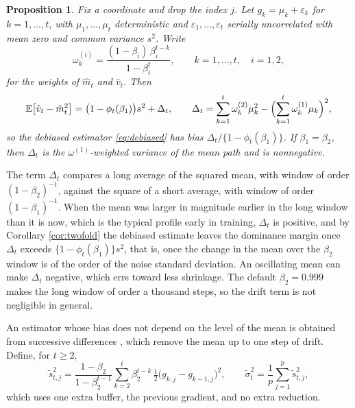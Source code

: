 \documentclass[pdflatex,sn-mathphys-num]{sn-jnl}%
\theoremstyle{thmstyleone}%
\newtheorem{proposition}[theorem]{Proposition}%
\theoremstyle{thmstyletwo}%
\theoremstyle{thmstylethree}%
\newcommand{\E}{\mathbb{E}}
\begin{document}
\begin{proposition}
\label{prop:drift}
Fix a coordinate and drop the index $j$. Let $g_k=\mu_k+\varepsilon_k$ for $k=1,\dots,t$, with $\mu_1,\dots,\mu_t$ deterministic and $\varepsilon_1,\dots,\varepsilon_t$ serially uncorrelated with mean zero and common variance $s^2$. Write
\begin{equation}
\omega^{(i)}_{k}=\frac{(1-\beta_i)\,\beta_i^{t-k}}{1-\beta_i^{t}},
\qquad k=1,\dots,t,\quad i=1,2,
\end{equation}
for the weights of $\hat m_t$ and $\hat v_t$. Then
\begin{equation}
\label{eq:drift_bias}
\E\bigl[\hat v_t-\hat m^2_t\bigr]=\bigl(1-\phi_t(\beta_1)\bigr)s^2+\Delta_t,
\qquad
\Delta_t=\sum_{k=1}^{t}\omega^{(2)}_k\mu^2_k-\Bigl(\sum_{k=1}^{t}\omega^{(1)}_k\mu_k\Bigr)^{2},
\end{equation}
so the debiased estimator \eqref{eq:debiased} has bias $\Delta_t/\{1-\phi_t(\beta_1)\}$. If $\beta_1=\beta_2$, then $\Delta_t$ is the $\omega^{(1)}$-weighted variance of the mean path and is nonnegative.
\end{proposition}

The term $\Delta_t$ compares a long average of the squared mean, with window of order $(1-\beta_2)^{-1}$, against the square of a short average, with window of order $(1-\beta_1)^{-1}$. When the mean was larger in magnitude earlier in the long window than it is now, which is the typical profile early in training, $\Delta_t$ is positive, and by Corollary \ref{cor:twofold} the debiased estimate leaves the dominance margin once $\Delta_t$ exceeds $\{1-\phi_t(\beta_1)\}s^2$, that is, once the change in the mean over the $\beta_2$ window is of the order of the noise standard deviation. An oscillating mean can make $\Delta_t$ negative, which errs toward less shrinkage. The default $\beta_2=0.999$ makes the long window of order a thousand steps, so the drift term is not negligible in general.

An estimator whose bias does not depend on the level of the mean is obtained from successive differences \cite{vonneumann1941}, which remove the mean up to one step of drift. Define, for $t\ge2$,
\begin{equation}
\label{eq:diff_estimator}
\tilde s^2_{t,j}=\frac{1-\beta_2}{1-\beta_2^{t-1}}\sum_{k=2}^{t}\beta_2^{t-k}\,\tfrac12\bigl(g_{k,j}-g_{k-1,j}\bigr)^2 ,
\qquad
\tilde\sigma^2_t=\frac1p\sum_{j=1}^{p}\tilde s^2_{t,j},
\end{equation}
which uses one extra buffer, the previous gradient, and no extra reduction.
\end{document}
